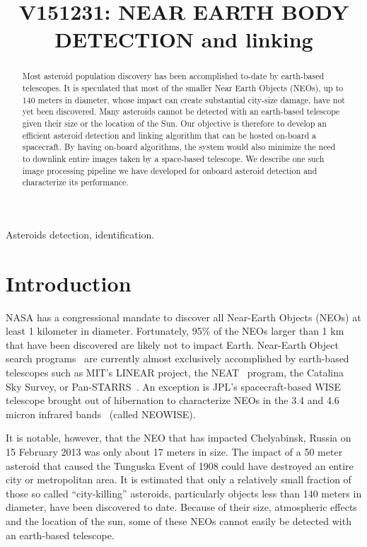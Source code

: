 \documentclass{article}
\title{V151231: NEAR EARTH BODY DETECTION and linking}
\begin{document}
%
\maketitle
%
\begin{abstract}
Most asteroid population discovery has been accomplished to-date by earth-based telescopes. It is speculated that most of the smaller Near Earth Objects (NEOs), up to 140 meters in diameter, whose impact can create substantial city-size damage, have not yet been discovered.  Many asteroids  cannot be detected with an earth-based telescope given their size or the location of the Sun.  Our objective is therefore to develop an efficient asteroid detection and linking algorithm that can be hosted on-board a spacecraft.  By having on-board algorithms, the system would also minimize the need to downlink entire images taken by a space-based telescope. We describe one such image processing pipeline we have developed for onboard asteroid detection and characterize its performance.
 
\end{abstract}
%
\begin{keywords}
Asteroids detection, identification. 
\end{keywords}
%
\section{Introduction}
\label{sec:intro}

NASA has a congressional mandate to discover all Near-Earth Objects (NEOs) at least 1 kilometer in diameter.  Fortunately, 95\% of the NEOs larger than 1 km that have been discovered are likely not to impact Earth.  
Near-Earth Object search programs~\cite{stokes2002near} are currently almost exclusively accomplished by earth-based telescopes such as MIT's LINEAR \cite{evans2003detection}  project, the NEAT~\cite{neat2014} program, the Catalina Sky Survey, or  Pan-STARRS~\cite{denneau2013pan}.  An exception is JPL's spacecraft-based WISE telescope brought out of hibernation to characterize NEOs in the 3.4 and 4.6 micron infrared bands~\cite{wise2014} (called NEOWISE). 

It is notable, however, that the NEO that has impacted Chelyabinsk, Russia on 15 February 2013 was only about 17 meters in size.  The impact of a 50 meter asteroid that caused the Tunguska Event of 1908 could have destroyed an entire city or metropolitan area. It is estimated that only a relatively small fraction of those so called ``city-killing'' asteroids, particularly objects less than 140 meters in diameter, have been discovered to date. Because of their size, atmospheric effects and the location of the sun, some of these NEOs cannot easily be detected with an earth-based telescope.  
\end{document}
